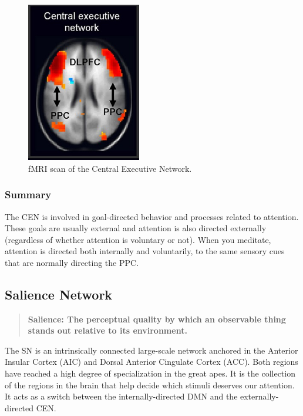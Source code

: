 \documentclass[a4paper, amsfonts, amssymb, amsmath, reprint, showkeys, nofootinbib, twoside]{revtex4-1}
\begin{document}

\begin{figure}[H]
  \centering
  \includegraphics[width=5cm]{images/fmri-cen.jpg}
  \caption{fMRI scan of the Central Executive Network.}
  \label{fig:fmri-cen}
\end{figure}

\subsubsection{Summary}

The CEN is involved in goal-directed behavior and processes
related to attention. These goals are usually external and attention is also directed
externally (regardless of whether attention is voluntary or not). When you meditate,
attention is directed both internally and voluntarily, to the same sensory cues that
are normally directing the PPC.

\subsection{Salience Network}

\begin{quote}
  \textbf{Salience: The perceptual quality by which an observable thing stands out
    relative to its environment.}
\end{quote}

The SN is an intrinsically connected large-scale network anchored in the Anterior
Insular Cortex (AIC) and Dorsal Anterior Cingulate Cortex (ACC). Both regions have reached a
high degree of specialization in the great apes. It is the collection of the regions
in the brain that help decide which stimuli deserves our attention. It acts as a
switch between the internally-directed DMN and the externally-directed CEN. \cite{saliencenetwork}
\end{document}
